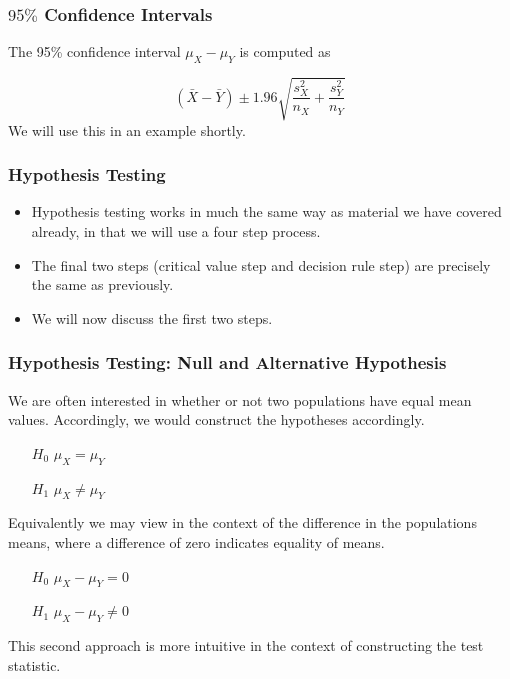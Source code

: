 \documentclass[a4]{beamer}
\begin{document}
\begin{frame}
\frametitle{$95\%$ Confidence Intervals}
The 95\% confidence interval $\mu_X - \mu_Y$ is computed as

\[ (\bar{X} - \bar{Y}) \pm 1.96 \sqrt{\frac{s^2_X}{n_X} + \frac{s^2_Y}{n_Y}}\]
We will use this in an example shortly.
\end{frame}
\begin{frame}
\frametitle{Hypothesis Testing}
\begin{itemize}
\item Hypothesis testing works in much the same way as material we have covered already, in that we will use a four step process.
\item The final two steps (critical value step and decision rule step) are precisely the same as previously.
\item We will now discuss the first two steps.
\end{itemize}
\end{frame}


\begin{frame}
\frametitle{Hypothesis Testing: Null and Alternative Hypothesis}
We are often interested in whether or not two populations have equal mean values. Accordingly, we would construct the hypotheses accordingly.
\begin{itemize}
\item[$H_0$] $\mu_X = \mu_Y$
\item[$H_1$] $\mu_X \neq \mu_Y$
\end{itemize}

Equivalently we may view in the context of the difference in the populations means, where a difference of zero indicates equality of means.
\begin{itemize}
\item[$H_0$] $\mu_X - \mu_Y = 0$
\item[$H_1$] $\mu_X - \mu_Y \neq 0$
\end{itemize}
This second approach is more intuitive in the context of constructing the test statistic.
\end{frame}
\end{document}
